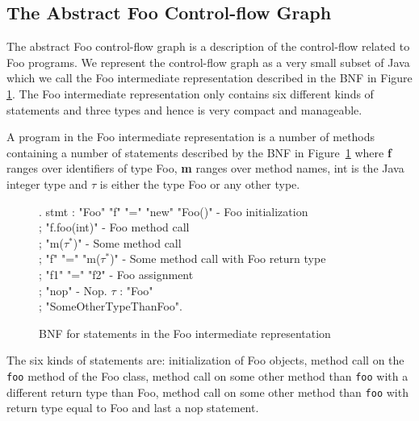 \documentclass{article}
\newcommand{\code}[1]{\texttt{\small #1}}
\begin{document}
\subsection{The Abstract Foo Control-flow Graph}
The abstract Foo control-flow graph is a description of the
control-flow related to Foo programs. We represent the control-flow
graph as a very small subset of Java which we call the Foo
intermediate representation described in the BNF in Figure
\ref{fig:stmt:bnf}. The Foo intermediate representation only contains
six different kinds of statements and three types and hence is very
compact and manageable.

A program in the Foo intermediate representation is a number of
methods containing a number of statements described by the BNF in
Figure~\ref{fig:stmt:bnf} where {\bf f} ranges over identifiers of type
Foo, {\bf m} ranges over method names, int is the Java integer type and
$\tau$ is either the type Foo or any other type.

\begin{figure}[!htb]
  \centering
    \vspace{-4ex}\mbox{}.
    stmt : "Foo" "f" "=" "new" "Foo()" - Foo initialization\\
         ; "f.foo(int)" - Foo method call\\
         ; "m($\tau^*$)" - Some method call\\
         ; "f" "=" "m($\tau^*$)" - Some method call with Foo return type\\
         ; "f1" "=" "f2" - Foo assignment\\
         ; "nop" - Nop.
    $\tau$ : "Foo"\\
           ; "SomeOtherTypeThanFoo".
  \end{grammar}
  \caption{BNF for statements in the Foo intermediate representation}
  \label{fig:stmt:bnf}
\end{figure}

The six kinds of statements are: initialization of Foo objects, method
call on the \code{foo} method of the Foo class, method call on some
other method than \code{foo} with a different return type than Foo,
method call on some other method than \code{foo} with return type
equal to Foo and last a nop statement.
\end{document}
